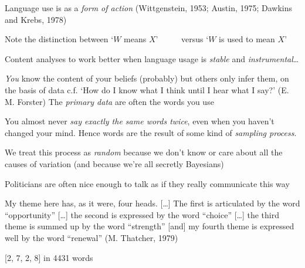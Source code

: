 \documentclass{mediumfoils}
\begin{document}

Language use is as a \textit{form of action} (Wittgenstein, 1953; Austin, 1975; Dawkins and Krebs, 1978)

Note the distinction between
\ita
\itm `$W$ {means} $X$'
\itm ~~~~~versus 
\itm `$W$ {is used to mean} $X$' 
\itz

Content analyses to work better when language usage is \textit{stable} and \textit{instrumental}\ldots




\textit{You} know the content of your beliefs (probably) 
but others only infer them, on the basis of data
\ita
\itm c.f. `How do I know what I think until I hear what I say?' (E. M. Forster)
\itz
The \textsl{primary data} are often the words you use 

You almost never \textit{say exactly the same words twice}, even when you haven't changed your mind.  Hence words are the result of some kind of \textsl{sampling process}.  
 
We treat this process as \textsl{random} because we don't know or care about all the causes of variation
\ita
\itm (and because we're all secretly Bayesians)
\itz

%
%
%
%


Politicians are often nice enough to talk as if they really communicate this way

\ita
\itm My theme here has, as it were, four heads. [\ldots] The first is articulated by the word ``opportunity'' [\ldots] the second is expressed by the word ``choice'' [\ldots] the third theme is summed up by the word ``strength'' [and] my fourth theme is expressed well by the word ``renewal''
\itm (M. Thatcher, 1979)
\itz

[2, 7, 2, 8] in 4431 words

\end{document}
